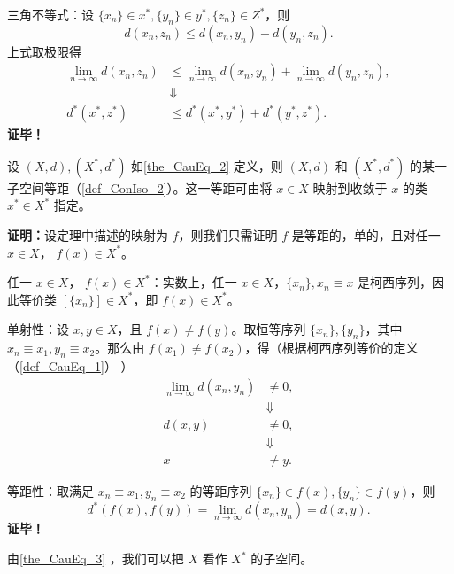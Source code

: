 三角不等式：设 $\{x_n\}\in x^*,\{y_n\}\in y^*,\{z_n\}\in Z^*$，则
\begin{equation}
d(x_n,z_n)\leq d(x_n,y_n)+d(y_n,z_n).~
\end{equation}
上式取极限得
\begin{equation}
\begin{aligned}
\lim_{n\rightarrow\infty}d(x_n,z_n)&\leq \lim_{n\rightarrow\infty}d(x_n,y_n)+\lim_{n\rightarrow\infty}d(y_n,z_n),\\
&\Downarrow\\
d^*(x^*,z^*)&\leq d^*(x^*,y^*)+d^*(y^*,z^*).
\end{aligned}
~
\end{equation}
\textbf{证毕！}

\begin{theorem}{}\label{the_CauEq_3}
设 $(X,d),(X^*,d^*)$ 如\autoref{the_CauEq_2} 定义，则 $(X,d)$ 和 $(X^*,d^*)$ 的某一子空间等距（\autoref{def_ConIso_2}）。这一等距可由将 $x\in X$ 映射到收敛于 $x$ 的类 $x^*\in X^*$ 指定。
\end{theorem}

\textbf{证明：}设定理中描述的映射为 $f$，则我们只需证明 $f$ 是等距的，单的，且对任一 $x\in X$， $f(x)\in X^*$。


任一 $x\in X$， $f(x)\in X^*$：实数上，任一 $x\in X$，$\{x_n\},x_n\equiv x$ 是柯西序列，因此等价类 $[\{x_n\}]\in X^*$，即 $f(x)\in X^*$。

单射性：设 $x, y\in X$，且 $f(x)\neq f(y)$。取恒等序列 $\{x_n\},\{y_n\}$，其中 $x_n\equiv x_1,y_n\equiv x_2$。那么由 $f(x_1)\neq f(x_2)$，得（根据柯西序列等价的定义（\autoref{def_CauEq_1}） ）
\begin{equation}
\begin{aligned}
\lim_{n\rightarrow\infty}d(x_n,y_n)&\neq 0,\\
&\Downarrow\\
d(x,y)&\neq0,\\
&\Downarrow\\
x&\neq y.
\end{aligned}~
\end{equation}

等距性：取满足 $x_n\equiv x_1,y_n\equiv x_2$ 的等距序列 $\{x_n\}\in f(x),\{y_n\}\in f(y)$，则
\begin{equation}
d^*(f(x),f(y))=\lim_{n\rightarrow\infty}d(x_n,y_n)=d(x,y).~
\end{equation}
\textbf{证毕！}

由\autoref{the_CauEq_3} ，我们可以把 $X$ 看作 $X^*$ 的子空间。

